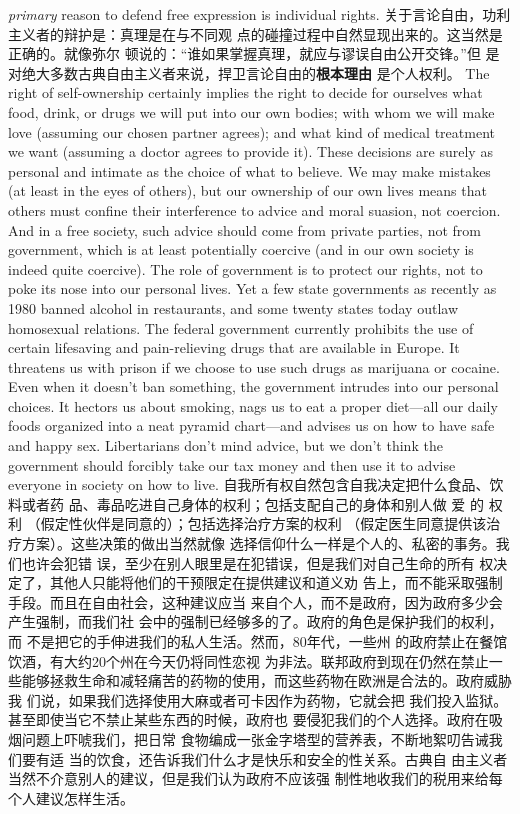 \begin{paracol}{2}
\textit{primary} reason to defend free expression is individual rights.
\switchcolumn
关于言论自由，功利主义者的辩护是：真理是在与不同观
点的碰撞过程中自然显现出来的。这当然是正确的。就像弥尔
顿说的：“谁如果掌握真理，就应与谬误自由公开交锋。”但
是对绝大多数古典自由主义者来说，捍卫言论自由的\textbf{根本理由}
是个人权利。
\switchcolumn*
The right of self-ownership certainly implies the right to decide for ourselves what food, drink, or drugs we will put into
our own bodies; with whom we will make love (assuming our
chosen partner agrees); and what kind of medical treatment we
want (assuming a doctor agrees to provide it). These decisions
are surely as personal and intimate as the choice of what to believe. We may make mistakes (at least in the eyes of others), but
our ownership of our own lives means that others must confine
their interference to advice and moral suasion, not coercion.
And in a free society, such advice should come from private parties, not from government, which is at least potentially coercive
(and in our own society is indeed quite coercive). The role of
government is to protect our rights, not to poke its nose into
our personal lives. Yet a few state governments as recently as
1980 banned alcohol in restaurants, and some twenty states
today outlaw homosexual relations. The federal government
currently prohibits the use of certain lifesaving and pain-relieving drugs that are available in Europe. It threatens us with
prison if we choose to use such drugs as marijuana or cocaine.
Even when it doesn't ban something, the government intrudes
into our personal choices. It hectors us about smoking, nags us
to eat a proper diet---all our daily foods organized into a neat
pyramid chart---and advises us on how to have safe and happy
sex. Libertarians don't mind advice, but we don't think the government should forcibly take our tax money and then use it to
advise everyone in society on how to live.
\switchcolumn
自我所有权自然包含自我决定把什么食品、饮料或者药
品、毒品吃进自己身体的权利；包括支配自己的身体和别人做
爱 的 权 利 （假定性伙伴是同意的）；包括选择治疗方案的权利
（假定医生同意提供该治疗方案）。这些决策的做出当然就像
选择信仰什么一样是个人的、私密的事务。我们也许会犯错
误，至少在别人眼里是在犯错误，但是我们对自己生命的所有
权决定了，其他人只能将他们的干预限定在提供建议和道义劝
告上，而不能采取强制手段。而且在自由社会，这种建议应当
来自个人，而不是政府，因为政府多少会产生强制，而我们社
会中的强制已经够多的了。政府的角色是保护我们的权利，而
不是把它的手伸进我们的私人生活。然而，80年代，一些州
的政府禁止在餐馆饮酒，有大约20个州在今天仍将同性恋视
为非法。联邦政府到现在仍然在禁止一些能够拯救生命和减轻痛苦的药物的使用，而这些药物在欧洲是合法的。政府威胁我
们说，如果我们选择使用大麻或者可卡因作为药物，它就会把
我们投入监狱。甚至即使当它不禁止某些东西的时候，政府也
要侵犯我们的个人选择。政府在吸烟问题上吓唬我们，把日常
食物编成一张金字塔型的营养表，不断地絮叨告诫我们要有适
当的饮食，还告诉我们什么才是快乐和安全的性关系。古典自
由主义者当然不介意别人的建议，但是我们认为政府不应该强
制性地收我们的税用来给每个人建议怎样生活。


\end{paracol}
